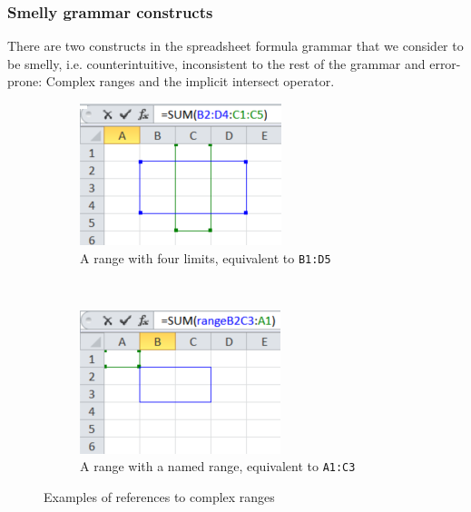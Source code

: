 \documentclass[conference]{IEEEtran}
\begin{document}
\subsubsection{Smelly grammar constructs}
There are two constructs in the spreadsheet formula grammar that we consider to be smelly, i.e. counterintuitive, inconsistent to the rest of the grammar and error-prone: Complex ranges and the implicit intersect operator.
\begin{figure}
	\centering
	\begin{subfigure}[b]{0.3\textwidth}
		\centering
		\includegraphics{complexRanges}
		\caption{A range with four limits, equivalent to \texttt{B1:D5}}
		\label{fig:complexA}
	\end{subfigure}
	~ %
	\begin{subfigure}[b]{0.3\textwidth}
		\centering
		\includegraphics{complexNamedRanges}
		\caption{A range with a named range, equivalent to \texttt{A1:C3}}
		\label{fig:complexB}
	\end{subfigure}
	\caption{Examples of references to complex ranges}\label{Figure:ComplexRanges}
\end{figure}
\end{document}
